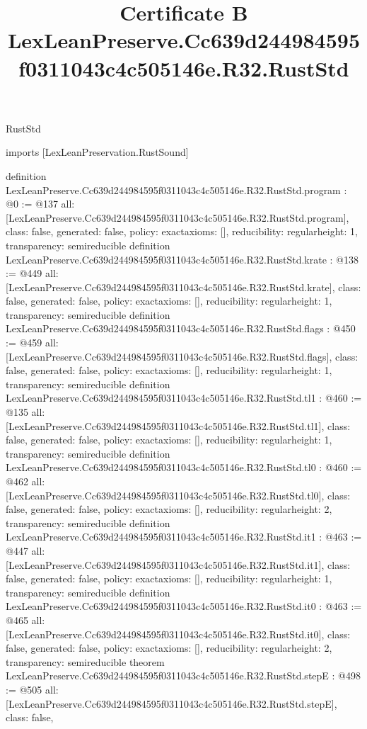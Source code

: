 \begin{lexlean}{RustStd}
\title{Certificate B LexLeanPreserve.Cc639d244984595f0311043c4c505146e.R32.RustStd}
\begin{coremodule}
imports [LexLeanPreservation.RustSound]

definition LexLeanPreserve.Cc639d244984595f0311043c4c505146e.R32.RustStd.program : @0 := @137 {
  all: [LexLeanPreserve.Cc639d244984595f0311043c4c505146e.R32.RustStd.program],
  class: false,
  generated: false,
  policy: exact{axioms: []},
  reducibility: regular{height: 1},
  transparency: semireducible
}
definition LexLeanPreserve.Cc639d244984595f0311043c4c505146e.R32.RustStd.krate : @138 := @449 {
  all: [LexLeanPreserve.Cc639d244984595f0311043c4c505146e.R32.RustStd.krate],
  class: false,
  generated: false,
  policy: exact{axioms: []},
  reducibility: regular{height: 1},
  transparency: semireducible
}
definition LexLeanPreserve.Cc639d244984595f0311043c4c505146e.R32.RustStd.flags : @450 := @459 {
  all: [LexLeanPreserve.Cc639d244984595f0311043c4c505146e.R32.RustStd.flags],
  class: false,
  generated: false,
  policy: exact{axioms: []},
  reducibility: regular{height: 1},
  transparency: semireducible
}
definition LexLeanPreserve.Cc639d244984595f0311043c4c505146e.R32.RustStd.tl1 : @460 := @135 {
  all: [LexLeanPreserve.Cc639d244984595f0311043c4c505146e.R32.RustStd.tl1],
  class: false,
  generated: false,
  policy: exact{axioms: []},
  reducibility: regular{height: 1},
  transparency: semireducible
}
definition LexLeanPreserve.Cc639d244984595f0311043c4c505146e.R32.RustStd.tl0 : @460 := @462 {
  all: [LexLeanPreserve.Cc639d244984595f0311043c4c505146e.R32.RustStd.tl0],
  class: false,
  generated: false,
  policy: exact{axioms: []},
  reducibility: regular{height: 2},
  transparency: semireducible
}
definition LexLeanPreserve.Cc639d244984595f0311043c4c505146e.R32.RustStd.it1 : @463 := @447 {
  all: [LexLeanPreserve.Cc639d244984595f0311043c4c505146e.R32.RustStd.it1],
  class: false,
  generated: false,
  policy: exact{axioms: []},
  reducibility: regular{height: 1},
  transparency: semireducible
}
definition LexLeanPreserve.Cc639d244984595f0311043c4c505146e.R32.RustStd.it0 : @463 := @465 {
  all: [LexLeanPreserve.Cc639d244984595f0311043c4c505146e.R32.RustStd.it0],
  class: false,
  generated: false,
  policy: exact{axioms: []},
  reducibility: regular{height: 2},
  transparency: semireducible
}
theorem LexLeanPreserve.Cc639d244984595f0311043c4c505146e.R32.RustStd.stepE : @498 := @505 {
  all: [LexLeanPreserve.Cc639d244984595f0311043c4c505146e.R32.RustStd.stepE],
  class: false,
}
\end{coremodule}
\end{lexlean}
